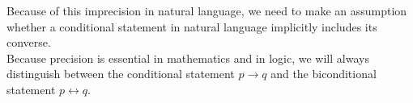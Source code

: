 \begin{tcolorbox}[colback=white, colframe=gray!60, title=Remark 5]
Because of this imprecision in natural language, we need to
make an assumption whether a conditional statement in natural language implicitly includes its
converse. \\ Because precision is essential in mathematics and in logic, we will always distinguish between the conditional statement $p\rightarrow q$ and the biconditional statement $p\leftrightarrow q$.
\end{tcolorbox}
